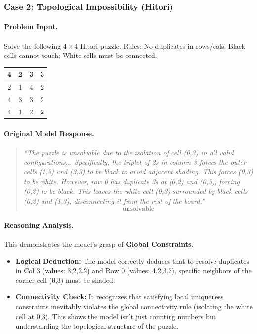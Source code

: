 \subsubsection*{Case 2: Topological Impossibility (Hitori)}

\paragraph{Problem Input.} 
Solve the following $4 \times 4$ Hitori puzzle. Rules: No duplicates in rows/cols; Black cells cannot touch; White cells must be connected.
\begin{center}
\small
\setlength{\tabcolsep}{4pt}
\begin{tabular}{|c|c|c|c|}
\hline
4 & 2 & \textbf{3} & \textbf{3} \\ \hline
2 & 1 & 4 & \textbf{2} \\ \hline
4 & 3 & 3 & 2 \\ \hline
4 & 1 & 2 & \textbf{2} \\ \hline
\end{tabular}
\end{center}

\paragraph{Original Model Response.}
\begin{quote}
\small
\textit{``The puzzle is unsolvable due to the isolation of cell (0,3) in all valid configurations... Specifically, the triplet of 2s in column 3 forces the outer cells (1,3) and (3,3) to be black to avoid adjacent shading. This forces (0,3) to be white. However, row 0 has duplicate 3s at (0,2) and (0,3), forcing (0,2) to be black. This leaves the white cell (0,3) surrounded by black cells (0,2) and (1,3), disconnecting it from the rest of the board.''}
\[ \boxed{\text{unsolvable}} \]
\end{quote}

\paragraph{Reasoning Analysis.}
This demonstrates the model's grasp of \textbf{Global Constraints}.
\begin{itemize}
    \item \textbf{Logical Deduction:} The model correctly deduces that to resolve duplicates in Col 3 (values: 3,2,2,2) and Row 0 (values: 4,2,3,3), specific neighbors of the corner cell (0,3) must be shaded.
    \item \textbf{Connectivity Check:} It recognizes that satisfying local uniqueness constraints inevitably violates the global connectivity rule (isolating the white cell at 0,3). This shows the model isn't just counting numbers but understanding the topological structure of the puzzle.
\end{itemize}

